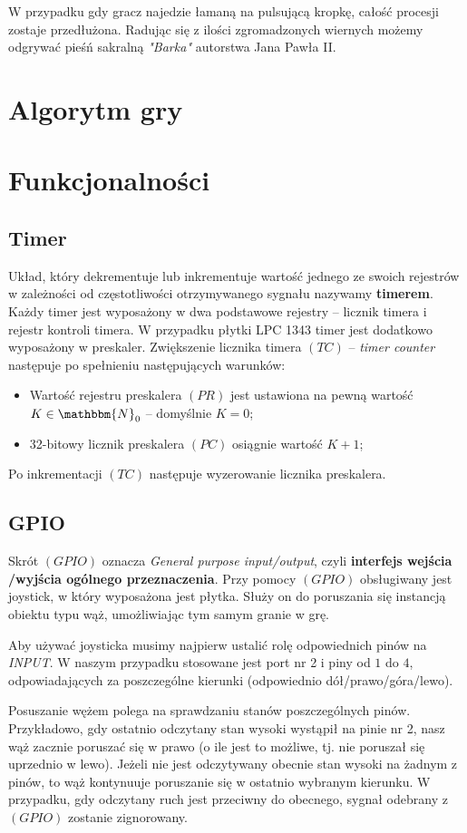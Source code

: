 \documentclass[a4paper,12pt,twoside]{article}
\newcommand{\N}{\mathbbm{N}}
\theoremstyle{plain}
\theoremstyle{definition}
\theoremstyle{remark}
\begin{document}
W przypadku gdy gracz najedzie łamaną na pulsującą kropkę, całość procesji zostaje przedłużona. Radując się z ilości zgromadzonych wiernych możemy odgrywać pieśń sakralną \textit{"Barka"} autorstwa Jana Pawła II.

\section{Algorytm gry}

\section{Funkcjonalności}
\subsection{Timer}
Układ, który dekrementuje lub inkrementuje wartość jednego ze swoich rejestrów w zależności od częstotliwości otrzymywanego sygnału nazywamy \textbf{timerem}. Każdy timer jest wyposażony w dwa podstawowe rejestry -- licznik timera i rejestr kontroli timera. W przypadku płytki LPC 1343 timer jest dodatkowo wyposażony w preskaler. Zwiększenie licznika timera $(TC)$ -- \textit{timer counter} następuje po spełnieniu następujących warunków:
\begin{itemize}
\item Wartość rejestru preskalera $(PR)$ jest ustawiona na pewną wartość $K\in \N_0$ -- domyślnie $K=0$;
\item 32-bitowy licznik preskalera $(PC)$ osiągnie wartość $K+1$;
\end{itemize}
Po inkrementacji $(TC)$ następuje wyzerowanie licznika preskalera.
\subsection{GPIO}
Skrót $(GPIO)$ oznacza \textit{General purpose input/output}, czyli \textbf{interfejs wejścia /wyjścia ogólnego przeznaczenia}. Przy pomocy $(GPIO)$ obsługiwany jest joystick, w który wyposażona jest płytka. Służy on do poruszania się instancją obiektu typu wąż, umożliwiając tym samym granie w grę.

Aby używać joysticka musimy najpierw ustalić rolę odpowiednich pinów na \textit{INPUT}. W naszym przypadku stosowane jest port nr 2 i piny od $1$ do $4$, odpowiadających za poszczególne kierunki (odpowiednio dół/prawo/góra/lewo). 

Posuszanie wężem polega na sprawdzaniu stanów poszczególnych pinów. Przykładowo, gdy ostatnio odczytany stan wysoki wystąpił na pinie nr 2, nasz wąż zacznie poruszać się w prawo (o ile jest to możliwe, tj. nie poruszał się uprzednio w lewo). Jeżeli nie jest odczytywany obecnie stan wysoki na żadnym z pinów, to wąż kontynuuje poruszanie się w ostatnio wybranym kierunku. W przypadku, gdy odczytany ruch jest przeciwny do obecnego, sygnał odebrany z $(GPIO)$ zostanie zignorowany.
\end{document}
